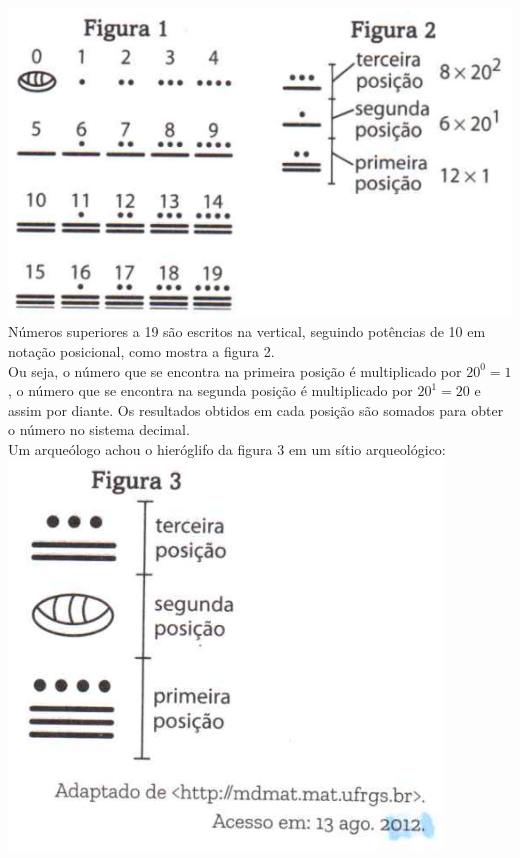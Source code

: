 \documentclass[a4paper,14pt]{article}
\begin{document}
\begin{multicols}{2}
\begin{enumerate}
			\includegraphics[width=1.1\linewidth]{6FMA15_imagens/imagem2} \\
			Números superiores a 19 são escritos na vertical, seguindo potências de 10 em notação posicional, como mostra a figura 2. \\
			Ou seja, o número que se encontra na primeira posição é multiplicado por $20^0 = 1$, o número que se encontra na segunda posição é multiplicado por $20^1 = 20$ e assim por diante. Os resultados obtidos em cada posição são somados para obter o número no sistema decimal. \\
			Um arqueólogo achou o hieróglifo da figura 3 em um sítio arqueológico: \\
			\includegraphics[width=1.1\linewidth]{6FMA15_imagens/imagem3} \\

\end{enumerate}
\end{multicols}
\end{document}
